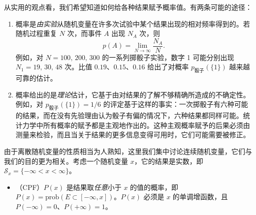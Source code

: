 从实用的观点看，我们希望知道如何给各种结果赋予概率值。有两条可能的途径：

\begin{enumerate}[itemsep=0.45em,topsep=0.4em]
  \item {}概率是\emph{由实验}从随机变量在许多次试验中某个结果出现的相对频率得到的。若随机过程重复 $N$ 次，而事件 $A$ 出现 $N_A$ 次，则
  \begin{equation*}
    p(A)=\lim_{N\to\infty}\frac{N_A}{N}.
  \end{equation*}
  例如，对 $N=100,\,200,\,300$ 的一系列掷骰子实验，数字 1 可能分别出现 $N_1=19,\,30,\,48$ 次。比值 $0.19$、$0.15$、$0.16$ 给出了对概率 $p_{\text{骰子}}(\{1\})$ 越来越可靠的估计。

  \item {}概率给出的是\emph{理论}估计，它基于由对结果的了解不够精确所造成的不确定性。例如，对 $p_{\text{骰子}}(\{1\})=1/6$ 的评定基于这样的事实：一次掷骰子有六种可能的结果，而在没有先验理由认为骰子有偏的情况下，六种结果都同样可能。统计力学中所有概率的赋予都是主观地作出的。这种主观概率赋予的后果必须由测量来检验，而且当关于结果的更多信息变得可用时，它们可能需要被修正。
\end{enumerate}


由于离散随机变量的性质相当为人熟知，这里我们集中讨论连续随机变量，它们与我们的目的更为相关。考虑一个随机变量 $x$，它的结果是实数，即 $\mathscr{S}_x=\{-\infty<x<\infty\}$。

\begin{itemize}[itemsep=0.45em,topsep=0.4em]
  \item {}（CPF）$P(x)$ 是结果取\emph{任意}小于 $x$ 的值的概率，即 $P(x)=\mathrm{prob}(E\subset[-\infty,x])$。$P(x)$ 必须是 $x$ 的单调增函数，且 $P(-\infty)=0$、$P(+\infty)=1$。
\end{itemize}



